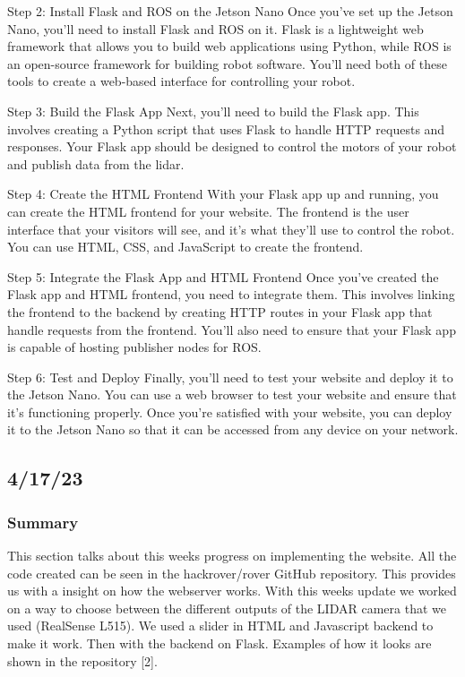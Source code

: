 \documentclass[a4paper, 10pt]{article}
\begin{document}
        Step 2: Install Flask and ROS on the Jetson Nano
        Once you've set up the Jetson Nano, you'll need to install Flask and ROS on it. Flask is a lightweight web framework that allows you to build web applications using Python, while ROS is an open-source framework for building robot software. You'll need both of these tools to create a web-based interface for controlling your robot.
        
        Step 3: Build the Flask App
        Next, you'll need to build the Flask app. This involves creating a Python script that uses Flask to handle HTTP requests and responses. Your Flask app should be designed to control the motors of your robot and publish data from the lidar.
        
        Step 4: Create the HTML Frontend
        With your Flask app up and running, you can create the HTML frontend for your website. The frontend is the user interface that your visitors will see, and it's what they'll use to control the robot. You can use HTML, CSS, and JavaScript to create the frontend.
        
        Step 5: Integrate the Flask App and HTML Frontend
        Once you've created the Flask app and HTML frontend, you need to integrate them. This involves linking the frontend to the backend by creating HTTP routes in your Flask app that handle requests from the frontend. You'll also need to ensure that your Flask app is capable of hosting publisher nodes for ROS.
        
        Step 6: Test and Deploy
        Finally, you'll need to test your website and deploy it to the Jetson Nano. You can use a web browser to test your website and ensure that it's functioning properly. Once you're satisfied with your website, you can deploy it to the Jetson Nano so that it can be accessed from any device on your network.

    \subsection{4/17/23}
        \subsubsection{Summary}
        This section talks about this weeks progress on implementing the website. All the code created can be seen in the hackrover/rover GitHub repository. This provides us with a insight on how the webserver works. With this weeks update we worked on a way to choose between the different outputs of the LIDAR camera that we used (RealSense L515). We used a slider in HTML and Javascript backend to make it work. Then with the backend on Flask. Examples of how it looks are shown in the repository [2].
\end{document}
